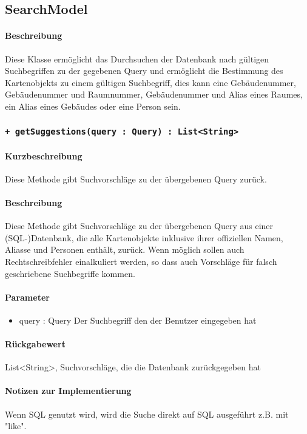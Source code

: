 \subsection{SearchModel}
\paragraph*{Beschreibung}
Diese Klasse ermöglicht das Durchsuchen der Datenbank nach gültigen Suchbegriffen zu der gegebenen Query 
und ermöglicht die Bestimmung des Kartenobjekts zu einem gültigen Suchbegriff, 
dies kann eine Gebäudenummer, Gebäudenummer und Raumnummer, Gebäudenummer und Alias eines Raumes, ein Alias eines Gebäudes oder eine Person sein.

\subsubsection{\texttt{+ getSuggestions(query : Query) : List<String>}}%
\paragraph*{Kurzbeschreibung}
Diese Methode gibt Suchvorschläge zu der übergebenen Query zurück.
\paragraph*{Beschreibung}
Diese Methode gibt Suchvorschläge zu der übergebenen Query aus einer (SQL-)Datenbank, 
die alle Kartenobjekte inklusive ihrer offiziellen Namen, Aliasse und Personen enthält, zurück.
Wenn möglich sollen auch Rechtschreibfehler einalkuliert werden, so dass auch Vorschläge für falsch geschriebene Suchbegriffe kommen.
\paragraph*{Parameter}
\begin{itemize}
    \item query : Query Der Suchbegriff den der Benutzer eingegeben hat
\end{itemize}
\paragraph*{Rückgabewert}
List<String>, Suchvorschläge, die die Datenbank zurückgegeben hat
\paragraph*{Notizen zur Implementierung}
Wenn SQL genutzt wird, wird die Suche direkt auf SQL ausgeführt z.B. mit "like".

